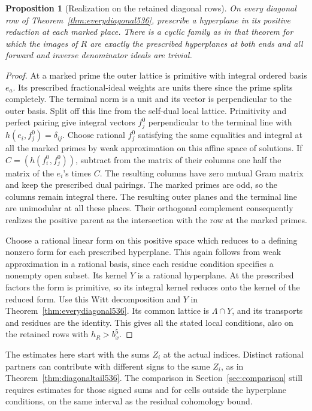 \documentclass[a4paper,11pt]{article}
\newtheorem{proposition}{Proposition}[section]
\theoremstyle{definition}
\theoremstyle{remark}
\numberwithin{equation}{section}
\begin{document}
\begin{proposition}[Realization on the retained diagonal rows]
\leavevmode\label{prop:realizedhyperplanes537}
On every diagonal row of Theorem~\ref{thm:everydiagonal536},
prescribe a hyperplane in its positive reduction at each marked
place. There is a cyclic family as in that theorem for which
the images of \(R\) are exactly the prescribed hyperplanes
at both ends and all forward and inverse denominator ideals
are trivial.
\end{proposition}
\begin{proof}
At a marked prime the outer lattice is primitive with integral
ordered basis \(e_a\). Its prescribed fractional-ideal weights
are units there since the prime splits completely. The terminal
norm is a unit and its vector is perpendicular to the outer
basis. Split off this line from the self-dual local lattice.
Primitivity and perfect pairing give integral vectors
\(f_j^0\) perpendicular to the terminal line with
\(h(e_i,f_j^0)=\delta_{ij}\). Choose rational \(f_j^0\)
satisfying the same equalities and integral at all the marked
primes by weak approximation on this affine space of solutions.
If \(C=(h(f_i^0,f_j^0))\), subtract from the matrix of their
columns one half the matrix of the \(e_i\)'s times \(C\).
The resulting columns have zero mutual Gram matrix and keep
the prescribed dual pairings. The marked primes are odd, so
the columns remain integral there. The resulting outer planes
and the terminal line are unimodular at all these places.
Their orthogonal complement consequently realizes the positive
parent as the intersection with the row at the marked primes.

Choose a rational linear form on this positive space which
reduces to a defining nonzero form for each prescribed
hyperplane. This again follows from weak approximation in a
rational basis, since each residue condition specifies a
nonempty open subset. Its kernel \(Y\) is a rational hyperplane.
At the prescribed factors the form is primitive, so its integral
kernel reduces onto the kernel of the reduced form.
Use this Witt decomposition and \(Y\) in
Theorem~\ref{thm:everydiagonal536}. Its common lattice is
\(\Lambda\cap Y\), and its transports and residues are the
identity. This gives all the stated local conditions, also
on the retained rows with \(h_R>b_x^5\).
\end{proof}

The estimates here start with the sums \(Z_i\) at the actual
indices. Distinct rational partners can contribute with different
signs to the same \(Z_i\), as in Theorem~\ref{thm:diagonaltail536}.
The comparison in Section~\ref{sec:comparison} still requires
estimates for those signed sums and for cells outside the
hyperplane conditions, on the same interval as the residual
cohomology bound.
\end{document}
